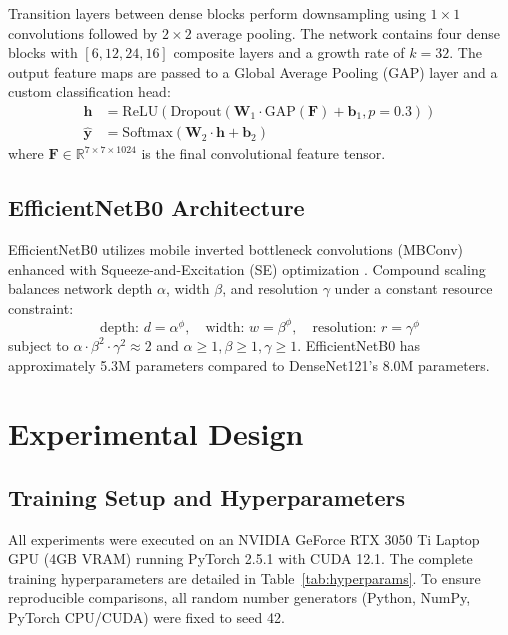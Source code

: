 \documentclass[conference]{IEEEtran}
\begin{document}
Transition layers between dense blocks perform downsampling using $1 \times 1$ convolutions followed by $2 \times 2$ average pooling. The network contains four dense blocks with $[6, 12, 24, 16]$ composite layers and a growth rate of $k=32$. The output feature maps are passed to a Global Average Pooling (GAP) layer and a custom classification head:
\begin{align}
    \mathbf{h} &= \text{ReLU}(\text{Dropout}(\mathbf{W}_1 \cdot \text{GAP}(\mathbf{F}) + \mathbf{b}_1, p=0.3)) \\
    \hat{\mathbf{y}} &= \text{Softmax}(\mathbf{W}_2 \cdot \mathbf{h} + \mathbf{b}_2)
\end{align}
where $\mathbf{F} \in \mathbb{R}^{7 \times 7 \times 1024}$ is the final convolutional feature tensor.

\subsection{EfficientNetB0 Architecture}
EfficientNetB0 \cite{tan2019efficientnet} utilizes mobile inverted bottleneck convolutions (MBConv) enhanced with Squeeze-and-Excitation (SE) optimization \cite{hu2018squeeze}. Compound scaling balances network depth $\alpha$, width $\beta$, and resolution $\gamma$ under a constant resource constraint:
\begin{equation}
    \text{depth: } d = \alpha^\phi, \quad \text{width: } w = \beta^\phi, \quad \text{resolution: } r = \gamma^\phi
\end{equation}
subject to $\alpha \cdot \beta^2 \cdot \gamma^2 \approx 2$ and $\alpha \ge 1, \beta \ge 1, \gamma \ge 1$. EfficientNetB0 has approximately 5.3M parameters compared to DenseNet121's 8.0M parameters.

\section{Experimental Design}
\subsection{Training Setup and Hyperparameters}
All experiments were executed on an NVIDIA GeForce RTX 3050 Ti Laptop GPU (4GB VRAM) running PyTorch 2.5.1 with CUDA 12.1. The complete training hyperparameters are detailed in Table~\ref{tab:hyperparams}. To ensure reproducible comparisons, all random number generators (Python, NumPy, PyTorch CPU/CUDA) were fixed to seed 42.
\end{document}
